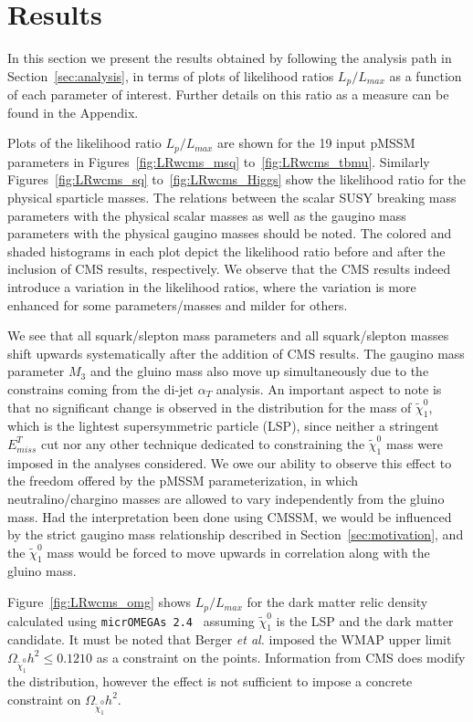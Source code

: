 \section{Results}
\label{sec:results}

In this section we present the results obtained by following the analysis path in Section~\ref{sec:analysis}, in terms of  plots of likelihood ratios $L_p / L_{max}$ as a function of each parameter of interest.  Further details on this ratio as a  measure can be found in the Appendix.  

Plots of the likelihood ratio $L_p/L_{max}$ are shown for the 19 input pMSSM parameters in Figures~\ref{fig:LRwcms_msq} to~\ref{fig:LRwcms_tbmu}.  Similarly Figures~\ref{fig:LRwcms_sq} to~\ref{fig:LRwcms_Higgs} show the likelihood ratio for the physical sparticle masses.  The relations between the scalar SUSY breaking mass parameters with the physical scalar masses as well as the gaugino mass parameters with the physical gaugino masses should be noted.  The colored and shaded histograms in each plot depict the likelihood ratio before and after the inclusion of CMS results, respectively.  We observe that the CMS results indeed introduce a variation in the likelihood ratios, where the variation is more enhanced for some parameters/masses and milder for others.  

We see that all squark/slepton mass parameters and all squark/slepton masses shift upwards systematically after the addition of CMS results.  The gaugino mass parameter $M_3$ and the gluino mass also move up simultaneously due to the constrains coming from the di-jet $\alpha_T$ analysis.  An important aspect to note is that no significant change is observed in the distribution for the mass of $\tilde{\chi}^0_1$, which is the lightest supersymmetric particle (LSP), since neither a stringent $E^T_{miss}$ cut nor any other technique dedicated to constraining the $\tilde{\chi}^0_1$ mass were imposed in the analyses considered.  We owe our ability to observe this effect to the freedom offered by the pMSSM parameterization, in which neutralino/chargino masses are allowed to vary independently from the gluino mass.  Had the interpretation been done using CMSSM, we would be influenced by the strict gaugino mass relationship described in Section~\ref{sec:motivation}, and the $\tilde{\chi}^0_1$ mass would be forced to move upwards in correlation along with the gluino mass.

Figure~\ref{fig:LRwcms_omg} shows $L_p/L_{max}$ for the dark matter relic density calculated using {\tt micrOMEGAs 2.4}~\cite{Belanger:2006is} assuming $\tilde{\chi}^0_1$ is the LSP and the dark matter candidate.  It must be noted that Berger {\it et al.} imposed the WMAP upper limit $\Omega_{\tilde{\chi}^0_1}h^2 \le 0.1210$ as a constraint on the points.  Information from CMS does modify the distribution, however the effect is not sufficient to impose a concrete constraint on $\Omega_{\tilde{\chi}^0_1}h^2$.

